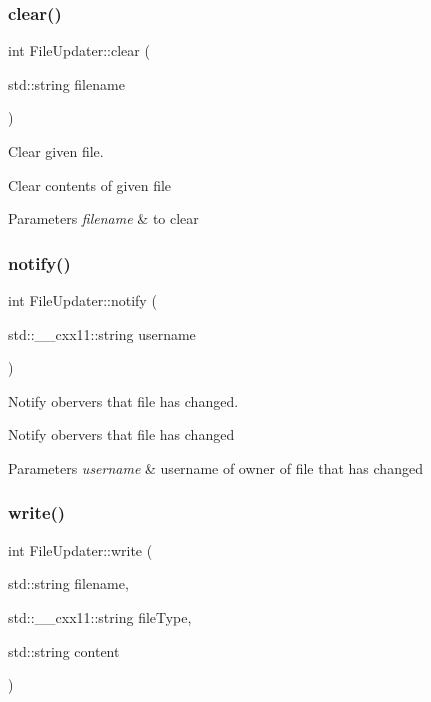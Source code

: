 \subsubsection{\texorpdfstring{clear()}{clear()}}
{\footnotesize\ttfamily int File\+Updater\+::clear (\begin{DoxyParamCaption}\item[{std\+::string}]{filename }\end{DoxyParamCaption})}



Clear given file. 

Clear contents of given file 
\begin{DoxyParams}{Parameters}
{\em filename} & to clear \\
\hline
\end{DoxyParams}
\mbox{\label{classFileUpdater_af1bce94e2a92dbc223af93bb1e0d2d86}} 
\subsubsection{\texorpdfstring{notify()}{notify()}}
{\footnotesize\ttfamily int File\+Updater\+::notify (\begin{DoxyParamCaption}\item[{std\+::\+\_\+\+\_\+cxx11\+::string}]{username }\end{DoxyParamCaption})}



Notify obervers that file has changed. 

Notify obervers that file has changed 
\begin{DoxyParams}{Parameters}
{\em username} & username of owner of file that has changed \\
\hline
\end{DoxyParams}
\mbox{\label{classFileUpdater_a68c2424d43c55207aa208d01f0dabc39}} 
\subsubsection{\texorpdfstring{write()}{write()}}
{\footnotesize\ttfamily int File\+Updater\+::write (\begin{DoxyParamCaption}\item[{std\+::string}]{filename,  }\item[{std\+::\+\_\+\+\_\+cxx11\+::string}]{file\+Type,  }\item[{std\+::string}]{content }\end{DoxyParamCaption})}



